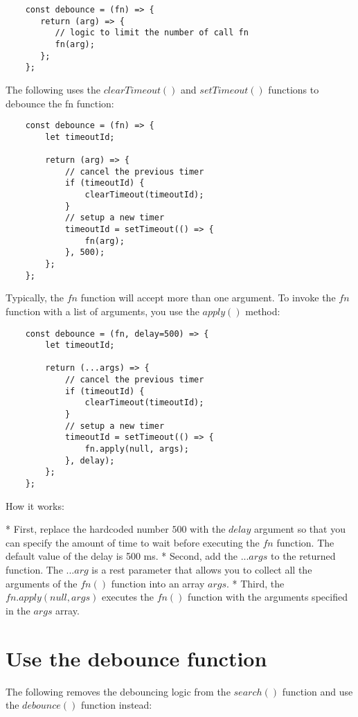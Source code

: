 \documentclass[11pt]{article}
\begin{document}
\begin{lstlisting}
    const debounce = (fn) => {
       return (arg) => {
          // logic to limit the number of call fn
          fn(arg);
       };
    };
\end{lstlisting}

The following uses the $clearTimeout()$ and $setTimeout()$ functions
to debounce the fn function:

\begin{lstlisting}
    const debounce = (fn) => {
        let timeoutId;

        return (arg) => {
            // cancel the previous timer
            if (timeoutId) {
                clearTimeout(timeoutId);
            }
            // setup a new timer
            timeoutId = setTimeout(() => {
                fn(arg);
            }, 500);
        };
    };
\end{lstlisting}

Typically, the $fn$ function will accept more than one argument.
To invoke the $fn$ function with a list of arguments,
you use the $apply()$ method:

\begin{lstlisting}
    const debounce = (fn, delay=500) => {
        let timeoutId;

        return (...args) => {
            // cancel the previous timer
            if (timeoutId) {
                clearTimeout(timeoutId);
            }
            // setup a new timer
            timeoutId = setTimeout(() => {
                fn.apply(null, args);
            }, delay);
        };
    };
\end{lstlisting}

How it works:

* First, replace the hardcoded number $500$ with the $delay$ argument so
that you can specify the amount of time to wait before executing the $fn$
function. The default value of the delay is 500 ms.
* Second, add the $...args$ to the returned function. The $...arg$
is a rest parameter that allows you to collect all the arguments
of the $fn()$ function into an array $args$.
* Third, the $fn.apply(null, args)$ executes the $fn()$ function with
the arguments specified in the $args$ array.

\section*{Use the debounce function}

The following removes the debouncing logic from the $search()$ function
and use the $debounce()$ function instead:
\end{document}
